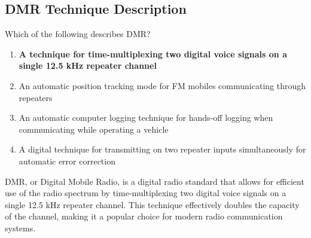 \subsection{DMR Technique Description}
\label{T8D07}

\begin{tcolorbox}[colback=gray!10!white,colframe=black!75!black,title=T8D07]
Which of the following describes DMR?
\begin{enumerate}[noitemsep]
    \item \textbf{A technique for time-multiplexing two digital voice signals on a single 12.5 kHz repeater channel}
    \item An automatic position tracking mode for FM mobiles communicating through repeaters
    \item An automatic computer logging technique for hands-off logging when communicating while operating a vehicle
    \item A digital technique for transmitting on two repeater inputs simultaneously for automatic error correction
\end{enumerate}
\end{tcolorbox}

DMR, or Digital Mobile Radio, is a digital radio standard that allows for efficient use of the radio spectrum by time-multiplexing two digital voice signals on a single 12.5 kHz repeater channel. This technique effectively doubles the capacity of the channel, making it a popular choice for modern radio communication systems.